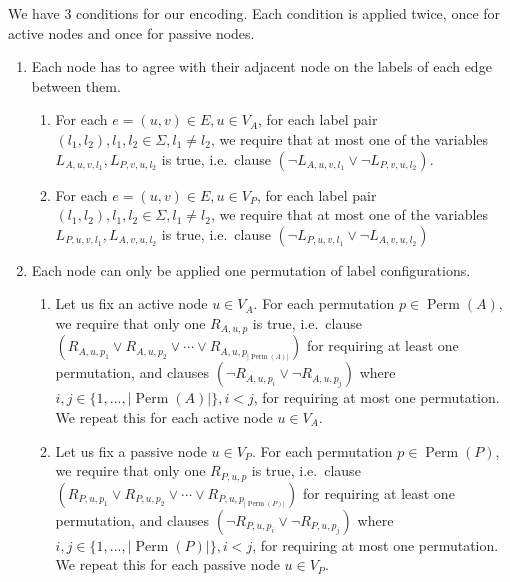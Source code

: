 \renewcommand{\labelenumi}{\arabic{enumi}.}
\renewcommand{\labelenumii}{\arabic{enumi}\alph{enumii}.}
We have 3 conditions for our encoding.
Each condition is applied twice, once for active nodes and once for passive nodes.
\begin{enumerate}
\item
  Each node has to agree with their adjacent node on the labels of each edge between them.
  \begin{enumerate}
  \item
    For each $e=(u, v)\in E, u\in V_A$, for each label pair $(l_1, l_2), l_1, l_2 \in \Sigma, l_1 \neq l_2$, we require that at most one of the variables $L_{A,u,v,l_1}, L_{P,v,u,l_2}$ is true, i.e.\ clause $(\neg L_{A,u,v,l_1} \lor \neg L_{P,v,u,l_2})$.
    \label{enu:sat_conditions:1a}
  \item
    For each $e=(u, v)\in E, u\in V_P$, for each label pair $(l_1, l_2), l_1, l_2 \in \Sigma, l_1 \neq l_2$, we require that at most one of the variables $L_{P,u,v,l_1}, L_{A,v,u,l_2}$ is true, i.e.\ clause $(\neg L_{P,u,v,l_1} \lor \neg L_{A,v,u,l_2})$
    \label{enu:sat_conditions:1b}
  \end{enumerate}
\item
  Each node can only be applied one permutation of label configurations.
  \begin{enumerate}
  \item
    Let us fix an active node $u \in V_A$.
    For each permutation $p \in \operatorname{Perm}(A)$, we require that only one $R_{A, u, p}$ is true, i.e.\ clause $(R_{A, u, p_1} \lor R_{A, u, p_2} \lor \dotsm \lor R_{A, u, p_{|\operatorname{Perm}(A)|}})$ for requiring at least one permutation,
    and clauses
    $ (\neg R_{A, u, p_i} \lor \neg R_{A, u, p_j})$ where $i, j \in \{1, ..., |\operatorname{Perm}(A)|\}, i < j$,
    for requiring at most one permutation.
    We repeat this for each active node $u \in V_A$.
    \label{enu:sat_conditions:2a}
  \item
    Let us fix a passive node $u \in V_P$.
    For each permutation $p \in \operatorname{Perm}(P)$, we require that only one $R_{P, u, p}$ is true, i.e.\ clause $(R_{P, u, p_1} \lor R_{P, u, p_2} \lor \dotsm \lor R_{P, u, p_{|\operatorname{Perm}(P)|}})$ for requiring at least one permutation,
    and clauses
    $ (\neg R_{P, u, p_i} \lor \neg R_{P, u, p_j})$ where $i, j \in \{1, ..., |\operatorname{Perm}(P)|\}, i < j$,
    for requiring at most one permutation.
    We repeat this for each passive node $u \in V_P$.
    \label{enu:sat_conditions:2b}
  \end{enumerate}

\end{enumerate}
